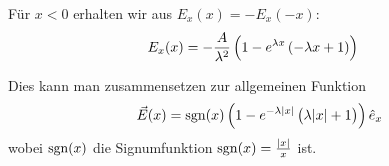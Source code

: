 \documentclass[a4paper,german,12pt,smallheadings]{scrartcl}
\begin{document}
\begin{enumerate}[a)]
  Für $x < 0$ erhalten wir aus $E_x(x) = -E_x(-x)$:
  \begin{align}
    E_x(x) &= -\frac{A}{\lambda^2} \del{1 - e^{\lambda x}\del{-\lambda x + 1}}
  \end{align}

  Dies kann man zusammensetzen zur allgemeinen Funktion
  \begin{equation}
    \vec{E}(x) = \sgn(x) \del{1 - e^{-\lambda |x|} \del{\lambda|x| + 1}} \hat{e}_x
  \end{equation}
  wobei $\operatorname{sgn}(x)$ die Signumfunktion $\operatorname{sgn}(x) = \frac{|x|}{x}$ ist.

\end{enumerate}
\end{document}
